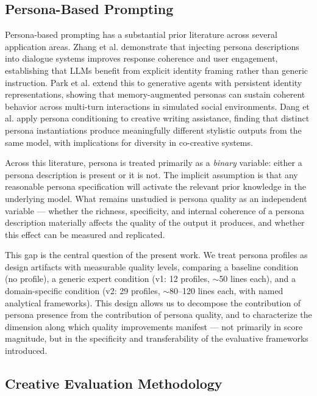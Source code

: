 \subsection{Persona-Based Prompting}

Persona-based prompting has a substantial prior literature across several application areas. Zhang et al. \cite{zhang2018personas} demonstrate that injecting persona descriptions into dialogue systems improves response coherence and user engagement, establishing that LLMs benefit from explicit identity framing rather than generic instruction. Park et al. \cite{park2023generative} extend this to generative agents with persistent identity representations, showing that memory-augmented personas can sustain coherent behavior across multi-turn interactions in simulated social environments. Dang et al. \cite{dang2023personas} apply persona conditioning to creative writing assistance, finding that distinct persona instantiations produce meaningfully different stylistic outputs from the same model, with implications for diversity in co-creative systems.

Across this literature, persona is treated primarily as a \emph{binary} variable: either a persona description is present or it is not. The implicit assumption is that any reasonable persona specification will activate the relevant prior knowledge in the underlying model. What remains unstudied is persona quality as an independent variable --- whether the richness, specificity, and internal coherence of a persona description materially affects the quality of the output it produces, and whether this effect can be measured and replicated.

This gap is the central question of the present work. We treat persona profiles as design artifacts with measurable quality levels, comparing a baseline condition (no profile), a generic expert condition (v1: 12 profiles, $\sim$50 lines each), and a domain-specific condition (v2: 29 profiles, $\sim$80--120 lines each, with named analytical frameworks). This design allows us to decompose the contribution of persona presence from the contribution of persona quality, and to characterize the dimension along which quality improvements manifest --- not primarily in score magnitude, but in the specificity and transferability of the evaluative frameworks introduced.

\subsection{Creative Evaluation Methodology}

